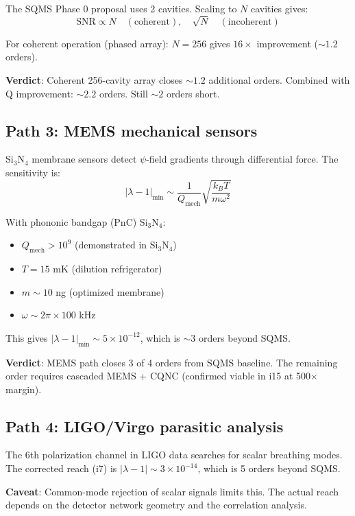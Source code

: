 \documentclass[11pt,a4paper]{article}
\begin{document}
The SQMS Phase 0 proposal uses 2 cavities. Scaling to $N$ cavities gives:
\begin{equation}
\text{SNR} \propto N \quad (\text{coherent}), \quad \sqrt{N} \quad (\text{incoherent})
\end{equation}

For coherent operation (phased array): $N = 256$ gives $16\times$ improvement ($\sim 1.2$ orders).

\textbf{Verdict}: Coherent 256-cavity array closes $\sim 1.2$ additional orders. Combined with Q improvement: $\sim 2.2$ orders. Still $\sim 2$ orders short.

\subsection{Path 3: MEMS mechanical sensors}

Si$_3$N$_4$ membrane sensors detect $\psi$-field gradients through differential force. The sensitivity is:
\begin{equation}
|\lambda - 1|_{\min} \sim \frac{1}{Q_{\text{mech}}} \sqrt{\frac{k_B T}{m \omega^2}}
\end{equation}

With phononic bandgap (PnC) Si$_3$N$_4$:
\begin{itemize}
\item $Q_{\text{mech}} > 10^9$ (demonstrated in Si$_3$N$_4$)
\item $T = 15$ mK (dilution refrigerator)
\item $m \sim 10$ ng (optimized membrane)
\item $\omega \sim 2\pi \times 100$ kHz
\end{itemize}

This gives $|\lambda-1|_{\min} \sim 5 \times 10^{-12}$, which is $\sim 3$ orders beyond SQMS.

\textbf{Verdict}: MEMS path closes 3 of 4 orders from SQMS baseline. The remaining order requires cascaded MEMS + CQNC (confirmed viable in i15 at 500$\times$ margin).

\subsection{Path 4: LIGO/Virgo parasitic analysis}

The 6th polarization channel in LIGO data searches for scalar breathing modes. The corrected reach (i7) is $|\lambda-1| \sim 3 \times 10^{-14}$, which is 5 orders beyond SQMS.

\textbf{Caveat}: Common-mode rejection of scalar signals limits this. The actual reach depends on the detector network geometry and the correlation analysis.
\end{document}
